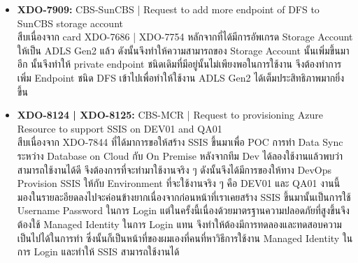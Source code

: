 \begin{itemize}
      \item \textbf{XDO-7909:} CBS-SunCBS | Request to add more endpoint of DFS to SunCBS storage account\\
            สืบเนื่องจาก card XDO-7686 | XDO-7754 หลักจากที่ได้มีการอัพเกรด Storage Account ให้เป็น ADLS Gen2 แล้ว ดังนั้นจึงทำให้ความสามารถของ Storage Account นั้นเพิ่มขึ้นมาอีก นั้นจึงทำให้ private endpoint ชนิดเดิมที่มีอยู่นั้นไม่เพียงพอในการใช้งาน จึงต้องทำการเพิ่ม Endpoint ชนิด DFS เข้าไปเพื่อทำให้ใช้งาน ADLS Gen2 ได้เต็มประสิทธิภาพมากยิ่งขึ้น
      \item \textbf{XDO-8124 | XDO-8125:} CBS-MCR | Request to provisioning Azure Resource to support SSIS on DEV01 and QA01\\
            สืบเนื่องจาก XDO-7844 ที่ได้มาการขอให้สร้าง SSIS ขึ้นมาเพื่อ POC การทำ Data Sync ระหว่าง Database on Cloud กับ On Premise หลังจากทีม Dev ได้ลองใช้งานแล้วพบว่าสามารถใช้งานได้ดี จึงต้องการที่จะทำมาใช้งานจริง ๆ ดังนั้นจึงได้มีการของให้ทาง DevOps Provision SSIS ให้กับ Environment ที่จะใช้งานจริง ๆ คือ DEV01 และ QA01 งานนี้มองในรายละอียดลงไปจะค่อนข้างยากเนื่องจากก่อนหน้าที่เราเคยสร้าง SSIS ขึ้นมานั้นเป็นการใช้ Username Password ในการ Login แต่ในครั้งนี้เนื่องด้วยมาตรฐานความปลอดภัยที่สูงขึ้นจึงต้องใช้ Managed Identity ในการ Login แทน จึงทำให้ต้องมีการทดลองและทดสอบความเป็นไปได้ในการทำ ซึ่งนั้นก็เป็นหน้าที่ของผมเองที่คนที่หาวิธีการใช้งาน Managed Identity ในการ Login และทำให้ SSIS สามารถใช้งานได้
            
\end{itemize}

